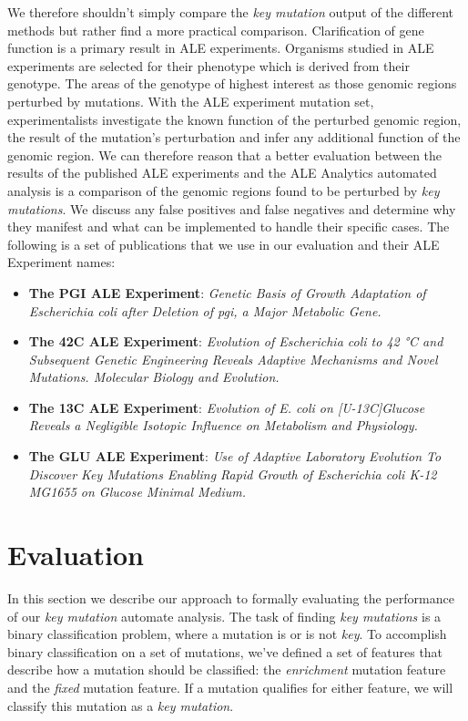 \documentclass[12pt,final,masters,chapterheads]{ucsd}  %
\begin{document}
We therefore shouldn't simply compare the \textit{key mutation} output of the different methods but rather find a more practical comparison. Clarification of gene function is a primary result in ALE experiments. Organisms studied in ALE experiments are selected for their phenotype which is derived from their genotype. The areas of the genotype of highest interest as those genomic regions perturbed by mutations. With the ALE experiment mutation set, experimentalists investigate the known function of the perturbed genomic region, the result of the mutation's perturbation and infer any additional function of the genomic region. We can therefore reason that a better evaluation between the results of the published ALE experiments and the ALE Analytics automated analysis is a comparison of the genomic regions found to be perturbed by \textit{key mutations}. We discuss any false positives and false negatives and determine why they manifest and what can be implemented to handle their specific cases. The following is a set of publications that we use in our evaluation and their ALE Experiment names:
\begin{itemize}
\item \textbf{The PGI ALE Experiment}: \textit{Genetic Basis of Growth Adaptation of Escherichia coli after Deletion of pgi, a Major Metabolic Gene.} \cite{10.1371/journal.pgen.1001186}
\item \textbf{The 42C ALE Experiment}: \textit{Evolution of Escherichia coli to 42 °C and Subsequent Genetic Engineering Reveals Adaptive Mechanisms and Novel Mutations. Molecular Biology and Evolution.} \cite{pmid25015645}
\item \textbf{The 13C ALE Experiment}: \textit{Evolution of E. coli on [U-13C]Glucose Reveals a Negligible Isotopic Influence on Metabolism and Physiology.} \cite{pmid26964043}
\item \textbf{The GLU ALE Experiment}: \textit{Use of Adaptive Laboratory Evolution To Discover Key Mutations Enabling Rapid Growth of Escherichia coli K-12 MG1655 on Glucose Minimal Medium.} \cite{pmid25304508}
\end{itemize}
\section{Evaluation}
In this section we describe our approach to formally evaluating the performance of our \textit{key mutation} automate analysis. The task of finding \textit{key mutations} is a binary classification problem, where a mutation is or is not \textit{key}. To accomplish binary classification on a set of mutations, we've defined a set of features that describe how a mutation should be classified: the \textit{enrichment} mutation feature and the \textit{fixed} mutation feature. If a mutation qualifies for either feature, we will classify this mutation as a \textit{key mutation}.
\end{document}
